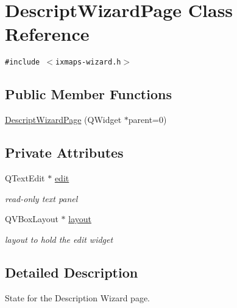 \hypertarget{classDescriptWizardPage}{
\section{DescriptWizardPage Class Reference}
\label{classDescriptWizardPage}
}
{\tt \#include $<$ixmaps-wizard.h$>$}

\subsection*{Public Member Functions}
\begin{CompactItemize}
\item 
\hyperlink{classDescriptWizardPage_b86921ecc720516df636de3be65a0e92}{DescriptWizardPage} (QWidget $\ast$parent=0)
\end{CompactItemize}
\subsection*{Private Attributes}
\begin{CompactItemize}
\item 
\hypertarget{classDescriptWizardPage_185fd1ab73965782ab00617d0da5e131}{
QTextEdit $\ast$ \hyperlink{classDescriptWizardPage_185fd1ab73965782ab00617d0da5e131}{edit}}
\label{classDescriptWizardPage_185fd1ab73965782ab00617d0da5e131}

\begin{CompactList}\small\item\em read-only text panel \item\end{CompactList}\item 
\hypertarget{classDescriptWizardPage_0ce32e4cfd66b16be77a9d41652297ce}{
QVBoxLayout $\ast$ \hyperlink{classDescriptWizardPage_0ce32e4cfd66b16be77a9d41652297ce}{layout}}
\label{classDescriptWizardPage_0ce32e4cfd66b16be77a9d41652297ce}

\begin{CompactList}\small\item\em layout to hold the edit widget \item\end{CompactList}\end{CompactItemize}


\subsection{Detailed Description}
State for the Description Wizard page. 

